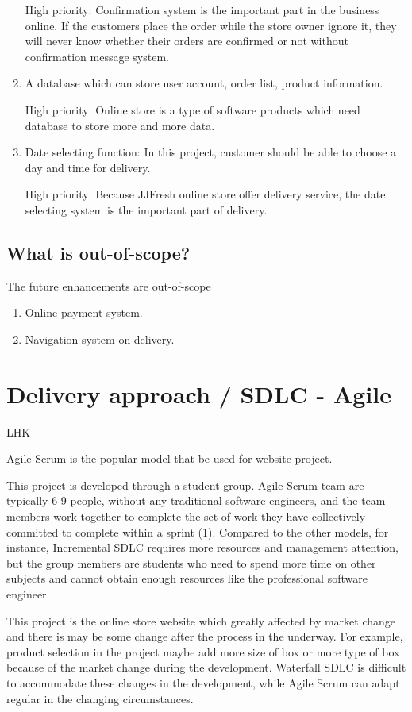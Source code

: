 \documentclass{report}
\begin{document}
\begin{enumerate}
  High priority: Confirmation system is the important part in the business online. If the customers place the order while the store owner ignore it, they will never know whether their orders are confirmed or not without confirmation message system.
  
  \item A database which can store user account, order list, product information.
  
  High priority: Online store is a type of software products which need database to store more and more data.
  
  \item Date selecting function: In this project, customer should be able to choose a day and time for delivery.
  
  High priority: Because JJFresh online store offer delivery service, the date selecting system is the important part of delivery.
\end{enumerate}
\subsection{What is out-of-scope?}
The future enhancements are out-of-scope
\begin{enumerate}
  \item Online payment system.
  \item Navigation system on delivery.
\end{enumerate}
\section{Delivery approach / SDLC - Agile}
LHK

Agile Scrum is the popular model that be used for website project.

This project is developed through a student group. Agile Scrum team are typically 6-9 people, without any traditional software engineers, and the team members work together to complete the set of work they have collectively committed to complete within a sprint (1). Compared to the other models, for instance, Incremental SDLC requires more resources and management attention, but the group members are students who need to spend more time on other subjects and cannot obtain enough resources like the professional software engineer.

This project is the online store website which greatly affected by market change and there is may be some change after the process in the underway. For example, product selection in the project maybe add more size of box or more type of box because of the market change during the development. Waterfall SDLC is difficult to accommodate these changes in the development, while Agile Scrum can adapt regular in the changing circumstances.
\end{document}
